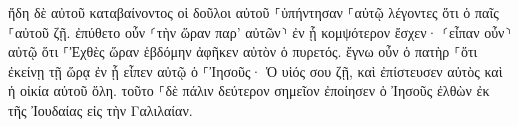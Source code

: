 \documentclass{openreader}
\begin{document}
ἤδη δὲ αὐτοῦ καταβαίνοντος οἱ δοῦλοι αὐτοῦ ⸀ὑπήντησαν ⸀αὐτῷ λέγοντες ὅτι ὁ παῖς ⸀αὐτοῦ ζῇ. 
ἐπύθετο οὖν ⸂τὴν ὥραν παρ’ αὐτῶν⸃ ἐν ᾗ κομψότερον ἔσχεν· ⸂εἶπαν οὖν⸃ αὐτῷ ὅτι ⸀Ἐχθὲς ὥραν ἑβδόμην ἀφῆκεν αὐτὸν ὁ πυρετός. 
ἔγνω οὖν ὁ πατὴρ ⸀ὅτι ἐκείνῃ τῇ ὥρᾳ ἐν ᾗ εἶπεν αὐτῷ ὁ ⸀Ἰησοῦς· Ὁ υἱός σου ζῇ, καὶ ἐπίστευσεν αὐτὸς καὶ ἡ οἰκία αὐτοῦ ὅλη. 
τοῦτο ⸀δὲ πάλιν δεύτερον σημεῖον ἐποίησεν ὁ Ἰησοῦς ἐλθὼν ἐκ τῆς Ἰουδαίας εἰς τὴν Γαλιλαίαν. 
\end{document}
